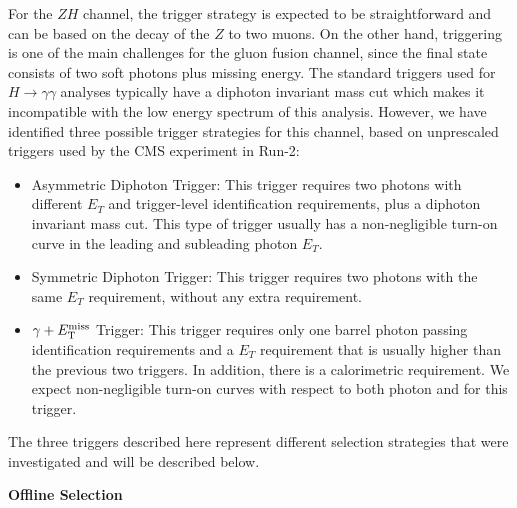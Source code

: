 For the $ZH$ channel, the trigger strategy is expected to be straightforward and can be based on the decay of the $Z$ to two muons.
%
%
On the other hand, triggering is one of the main challenges for the gluon fusion channel, since the final state consists of two soft photons plus missing energy. The standard triggers used for $H\rightarrow\gamma\gamma$ analyses typically have a diphoton invariant mass cut which makes it incompatible with the low energy spectrum of this analysis. However, we have identified three possible trigger strategies for this channel, based on  unprescaled triggers used by the CMS experiment in Run-2:

\begin{itemize}
\item Asymmetric Diphoton Trigger: This trigger requires two photons with different $E_{T}$ and trigger-level identification requirements, plus a diphoton invariant mass cut. This type of trigger usually has a non-negligible turn-on curve in the leading and subleading photon  $E_{T}$.
\item Symmetric Diphoton Trigger: This trigger requires two photons with the same $E_{T}$ requirement, without any extra requirement.
\item $\gamma+E_{\mathrm{T}}^{\text{miss}}$ Trigger: This trigger requires only one barrel photon passing identification requirements and a $E_{T}$ requirement that is usually higher than the previous two triggers. In addition, there is a calorimetric \MET requirement. We expect non-negligible turn-on curves with respect to both photon and \MET for this trigger.
\end{itemize}

The three triggers described here represent different selection strategies that were investigated and will be described below.


\vspace{0.2cm} \textbf{Offline Selection}

